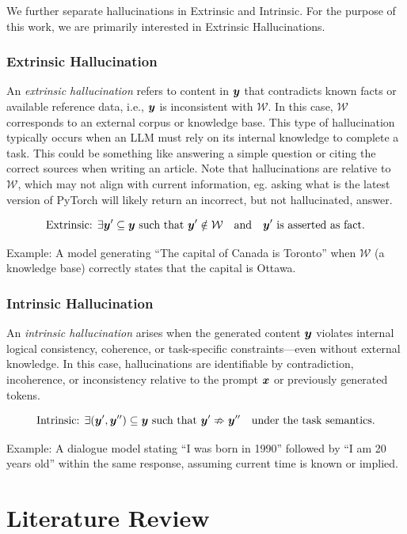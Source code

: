 \documentclass[11pt, oneside]{book}
\theoremstyle{plain}
\theoremstyle{definition}
\theoremstyle{remark}
\begin{document}
We further separate hallucinations in Extrinsic and Intrinsic. For the purpose of this work, we are primarily interested in Extrinsic Hallucinations.

\subsection*{Extrinsic Hallucination}

An \emph{extrinsic hallucination} refers to content in ${\bm{y}}$ that contradicts known facts or available reference data, i.e., ${\bm{y}}$ is inconsistent with $\mathcal{W}$. In this case, $\mathcal{W}$ corresponds to an external corpus or knowledge base. This type of hallucination typically occurs when an LLM must rely on its internal knowledge to complete a task. This could be something like answering a simple question or citing the correct sources when writing an article. Note that hallucinations are relative to $\mathcal{W}$, which may not align with current information, eg. asking what is the latest version of PyTorch will likely return an incorrect, but not hallucinated, answer. 

\[
\text{Extrinsic: } \exists {\bm{y}}' \subseteq {\bm{y}} \text{ such that } {\bm{y}}' \notin \mathcal{W} \quad \text{and} \quad {\bm{y}}' \text{ is asserted as fact}.
\]

Example: A model generating ``The capital of Canada is Toronto'' when $\mathcal{W}$ (a knowledge base) correctly states that the capital is Ottawa.

\subsection*{Intrinsic Hallucination}

An \emph{intrinsic hallucination} arises when the generated content ${\bm{y}}$ violates internal logical consistency, coherence, or task-specific constraints—even without external knowledge. In this case, hallucinations are identifiable by contradiction, incoherence, or inconsistency relative to the prompt ${\bm{x}}$ or previously generated tokens.

\[
\text{Intrinsic: } \exists ({\bm{y}}', {\bm{y}}'') \subseteq {\bm{y}} \text{ such that } {\bm{y}}' \nRightarrow {\bm{y}}'' \quad \text{under the task semantics}.
\]

Example: A dialogue model stating ``I was born in 1990'' followed by ``I am 20 years old'' within the same response, assuming current time is known or implied.


\chapter{Literature Review}
\end{document}
